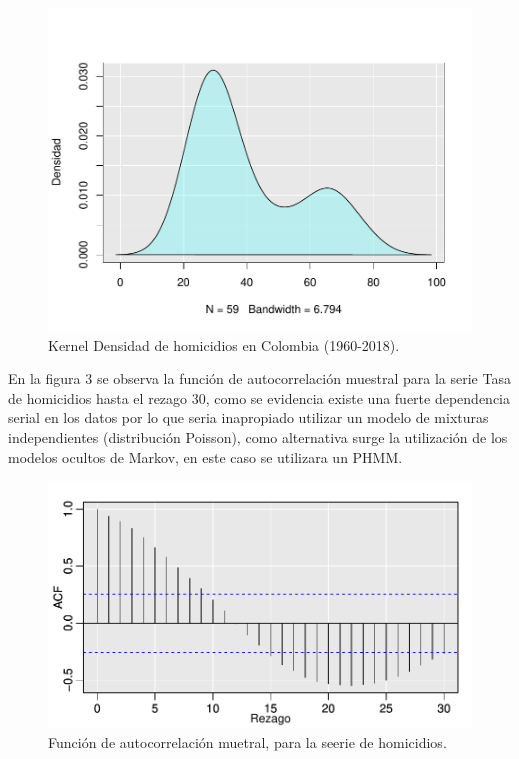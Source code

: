 \documentclass[a4paper]{article}\usepackage[]{graphicx}\usepackage[]{color}
\makeatletter
\def\maxwidth{ %
  \ifdim\Gin@nat@width>\linewidth
    \linewidth
  \else
    \Gin@nat@width
  \fi
}
\newenvironment{knitrout}{}{} %
\makeatother
\begin{document}
\begin{knitrout}
\color{fgcolor}\begin{figure}
\includegraphics[width=\maxwidth]{figure/unnamed-chunk-7-1} \caption[Kernel Densidad de homicidios en Colombia (1960-2018)]{Kernel Densidad de homicidios en Colombia (1960-2018).}\label{fig:unnamed-chunk-7}
\end{figure}


\end{knitrout}

En la figura 3 se observa la función de autocorrelación muestral para la serie Tasa de homicidios hasta el rezago 30, como se evidencia existe una fuerte dependencia serial en los datos por lo que seria inapropiado utilizar un modelo de mixturas independientes (distribución Poisson), como alternativa surge la utilización de los modelos ocultos de Markov, en este caso se utilizara un PHMM.

\begin{knitrout}
\color{fgcolor}\begin{figure}
\includegraphics[width=\maxwidth]{figure/unnamed-chunk-8-1} \caption[Función de autocorrelación muetral, para la seerie de homicidios]{Función de autocorrelación muetral, para la seerie de homicidios.}\label{fig:unnamed-chunk-8}
\end{figure}


\end{knitrout}
\end{document}
